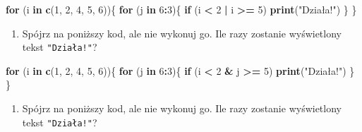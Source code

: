 \documentclass[paper=6in:9in,pagesize=pdftex,headinclude=on,footinclude=on,10pt]{scrbook}
\newenvironment{Shaded}{\begin{snugshade}}{\end{snugshade}}
\newcommand{\ControlFlowTok}[1]{\textcolor[rgb]{0.13,0.29,0.53}{\textbf{#1}}}
\newcommand{\DecValTok}[1]{\textcolor[rgb]{0.00,0.00,0.81}{#1}}
\newcommand{\KeywordTok}[1]{\textcolor[rgb]{0.13,0.29,0.53}{\textbf{#1}}}
\newcommand{\NormalTok}[1]{#1}
\newcommand{\OperatorTok}[1]{\textcolor[rgb]{0.81,0.36,0.00}{\textbf{#1}}}
\newcommand{\StringTok}[1]{\textcolor[rgb]{0.31,0.60,0.02}{#1}}
\providecommand{\tightlist}{%
  \setlength{\itemsep}{0pt}\setlength{\parskip}{0pt}}
\begin{document}
\begin{Shaded}
\begin{Highlighting}[]
\ControlFlowTok{for}\NormalTok{ (i }\ControlFlowTok{in} \KeywordTok{c}\NormalTok{(}\DecValTok{1}\NormalTok{, }\DecValTok{2}\NormalTok{, }\DecValTok{4}\NormalTok{, }\DecValTok{5}\NormalTok{, }\DecValTok{6}\NormalTok{))\{}
  \ControlFlowTok{for}\NormalTok{ (j }\ControlFlowTok{in} \DecValTok{6}\OperatorTok{:}\DecValTok{3}\NormalTok{)\{}
    \ControlFlowTok{if}\NormalTok{ (i }\OperatorTok{<}\StringTok{ }\DecValTok{2} \OperatorTok{|}\StringTok{ }\NormalTok{i }\OperatorTok{>=}\StringTok{ }\DecValTok{5}\NormalTok{)}
      \KeywordTok{print}\NormalTok{(}\StringTok{"Działa!"}\NormalTok{)}
\NormalTok{  \}}
\NormalTok{\}}
\end{Highlighting}
\end{Shaded}

\begin{enumerate}
\def\labelenumi{\arabic{enumi})}
\setcounter{enumi}{2}
\tightlist
\item
  Spójrz na poniższy kod, ale nie wykonuj go.
  Ile razy zostanie wyświetlony tekst \texttt{"Działa!"}?
\end{enumerate}

\begin{Shaded}
\begin{Highlighting}[]
\ControlFlowTok{for}\NormalTok{ (i }\ControlFlowTok{in} \KeywordTok{c}\NormalTok{(}\DecValTok{1}\NormalTok{, }\DecValTok{2}\NormalTok{, }\DecValTok{4}\NormalTok{, }\DecValTok{5}\NormalTok{, }\DecValTok{6}\NormalTok{))\{}
  \ControlFlowTok{for}\NormalTok{ (j }\ControlFlowTok{in} \DecValTok{6}\OperatorTok{:}\DecValTok{3}\NormalTok{)\{}
    \ControlFlowTok{if}\NormalTok{ (i }\OperatorTok{<}\StringTok{ }\DecValTok{2} \OperatorTok{&}\StringTok{ }\NormalTok{j }\OperatorTok{>=}\StringTok{ }\DecValTok{5}\NormalTok{)}
      \KeywordTok{print}\NormalTok{(}\StringTok{"Działa!"}\NormalTok{)}
\NormalTok{  \}}
\NormalTok{\}}
\end{Highlighting}
\end{Shaded}

\begin{enumerate}
\def\labelenumi{\arabic{enumi})}
\setcounter{enumi}{3}
\tightlist
\item
  Spójrz na poniższy kod, ale nie wykonuj go.
  Ile razy zostanie wyświetlony tekst \texttt{"Działa!"}?
\end{enumerate}
\end{document}
